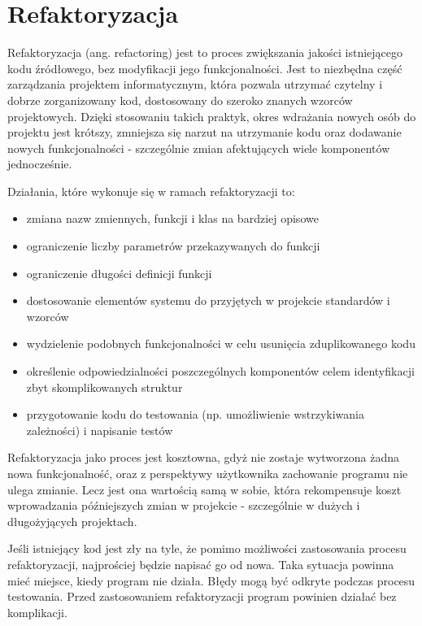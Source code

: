 \section{Refaktoryzacja}
Refaktoryzacja (ang. refactoring) jest to proces zwiększania jakości istniejącego kodu źródłowego, bez modyfikacji jego funkcjonalności. Jest to niezbędna część zarządzania projektem informatycznym, która pozwala utrzymać czytelny i dobrze zorganizowany kod, dostosowany do szeroko znanych wzorców projektowych. Dzięki stosowaniu takich praktyk, okres wdrażania nowych osób do projektu jest krótszy, zmniejsza się narzut na utrzymanie kodu oraz dodawanie nowych funkcjonalności - szczególnie zmian afektujących wiele komponentów jednocześnie. 

Działania, które wykonuje się w ramach refaktoryzacji to:
\begin{itemize}
\item zmiana nazw zmiennych, funkcji i klas na bardziej opisowe
\item ograniczenie liczby parametrów przekazywanych do funkcji
\item ograniczenie długości definicji funkcji
\item dostosowanie elementów systemu do przyjętych w projekcie standardów i wzorców
\item wydzielenie podobnych funkcjonalności w celu usunięcia zduplikowanego kodu
\item określenie odpowiedzialności poszczególnych komponentów celem identyfikacji zbyt skomplikowanych struktur
\item przygotowanie kodu do testowania (np. umożliwienie wstrzykiwania zależności) i napisanie testów
\end{itemize}

Refaktoryzacja jako proces jest kosztowna, gdyż nie zostaje wytworzona żadna nowa funkcjonalność, oraz z perspektywy użytkownika zachowanie programu nie ulega zmianie. Lecz jest ona wartością samą w sobie, która rekompensuje koszt wprowadzania późniejszych zmian w projekcie - szczególnie w dużych i długożyjących projektach.


Jeśli istniejący kod jest zły na tyle, że pomimo możliwości zastosowania procesu refaktoryzacji, najprościej będzie napisać go od nowa. Taka sytuacja powinna mieć miejsce, kiedy program nie działa. Błędy mogą być odkryte podczas procesu testowania. Przed zastosowaniem refaktoryzacji program powinien działać bez komplikacji.

